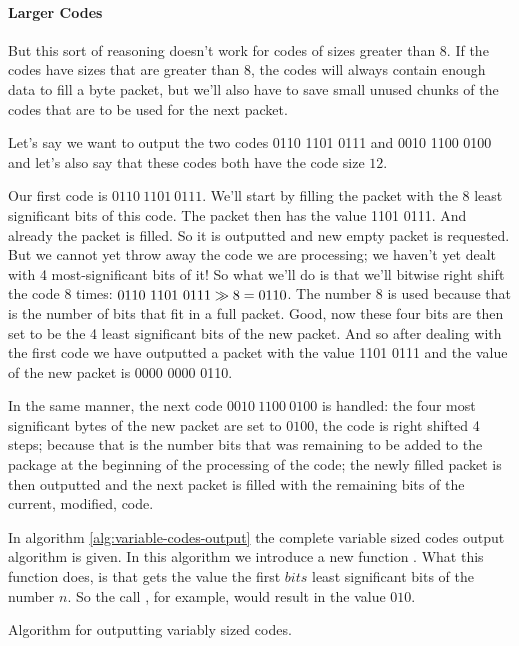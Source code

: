 \begin{refsection}
\paragraph{Larger Codes}

But this sort of reasoning doesn't work for codes of sizes greater
than $8$. If the codes have sizes that are greater than $8$, the codes
will always contain enough data to fill a byte packet, but we'll also
have to save small unused chunks of the codes that are to be used for
the next packet.

Let's say we want to output the two codes 0110 1101 0111 and 0010 1100
0100 and let's also say that these codes both have the code size
$12$.

Our first code is $0110\ 1101\ 0111$. We'll start by filling the packet
with the 8 least significant bits of this code. The packet then has
the value 1101 0111. And already the packet is filled. So it is
outputted and new empty packet is requested. But we cannot yet throw
away the code we are processing; we haven't yet dealt with 4
most-significant bits of it! So what we'll do is that we'll bitwise
right shift the code 8 times: $0110\ 1101\ 0111 \ShiftRight 8 =
0110$. The number $8$ is used because that is the number of bits that
fit in a full packet. Good, now these four bits are then set to be the
4 least significant bits of the new packet. And so after dealing with
the first code we have outputted a packet with the value 1101 0111 and
the value of the new packet is 0000 0000 0110.

In the  same manner, the  next code $0010\  1100\ 0100$ is  handled: the
four most significant  bytes of the new packet are  set to $0100$, the
code is  right shifted 4 steps;  because that is the  number bits that
was  remaining to  be added  to the  package at  the beginning  of the
processing of the code; the  newly filled packet is then outputted and
the  next packet is  filled with  the remaining  bits of  the current,
modified, code.

In algorithm \ref{alg:variable-codes-output} the complete variable
sized codes output algorithm is given. In this algorithm we introduce
a new function . What
this function does, is that gets the value the first $bits$ least
significant bits of the number $n$. So the call
, for example, would result in the value
$010$.

\begin{algorithm}[H]
  \caption{Algorithm for outputting variably sized codes.}
  \label{alg:variable-codes-output}
  \begin{algorithmic}[1]


\end{algorithmic}
\end{algorithm}
\end{refsection}
